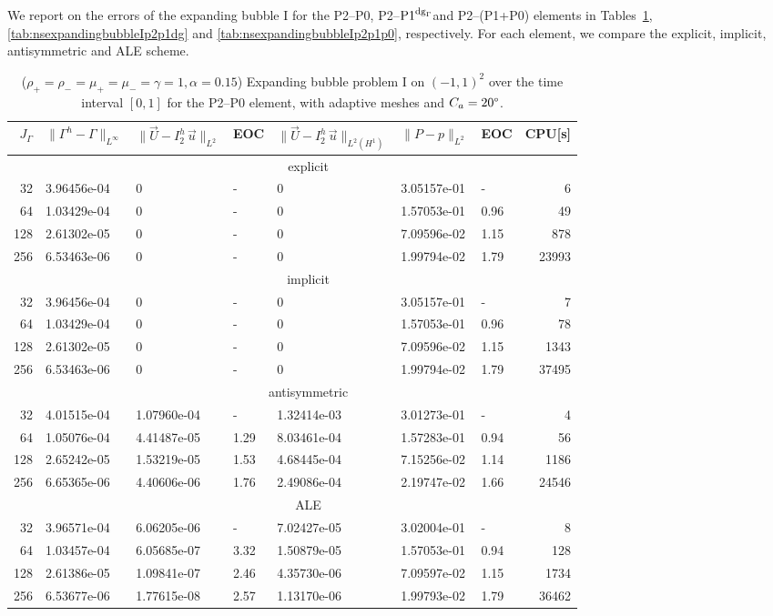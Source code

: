 \documentclass[a4paper,12pt,onecolumn]{article}
\newcommand{\errorXx}{\|\Gamma^h - \Gamma\|_{L^\infty}}
\newcommand{\LerrorUu}[1]{\|\vec U - I^h_{#1}\,\vec u\|_{L^2}}
\newcommand{\HerrorUu}[1]{\|\vec U - I^h_{#1}\,\vec u\|_{L^2(H^1)}}
\newcommand{\LerrorPp}{\|P - p\|_{L^2}}
\newcommand{\pdg}{${\rm P1}^{{\rm dg}_\Gamma}$} %
\begin{document}
We report on the errors of the expanding bubble I for the P2--P0, P2--\pdg and
P2--(P1+P0) elements in Tables~\ref{tab:nsexpandingbubbleIp2p0},
\ref{tab:nsexpandingbubbleIp2p1dg} and \ref{tab:nsexpandingbubbleIp2p1p0},
respectively. For each element, we compare the explicit, implicit,
antisymmetric and ALE scheme.
\begin{table}
\center
\hspace*{-3.25cm}
\begin{tabular}{rllllllr}
\hline
$J_\Gamma$ & $\errorXx$ & $\LerrorUu2$ & EOC & $\HerrorUu2$ & $\LerrorPp$ & EOC
& CPU[s] \\
\hline
& \multicolumn{7}{c}{explicit} \\
\hline
 32 & 3.96456e-04 & 0 & - & 0 & 3.05157e-01 &    - &     6 \\
 64 & 1.03429e-04 & 0 & - & 0 & 1.57053e-01 & 0.96 &    49 \\
128 & 2.61302e-05 & 0 & - & 0 & 7.09596e-02 & 1.15 &   878 \\
256 & 6.53463e-06 & 0 & - & 0 & 1.99794e-02 & 1.79 & 23993 \\
\hline
& \multicolumn{7}{c}{implicit} \\
\hline
 32 & 3.96456e-04 & 0 & - & 0 & 3.05157e-01 &    - &     7 \\
 64 & 1.03429e-04 & 0 & - & 0 & 1.57053e-01 & 0.96 &    78 \\
128 & 2.61302e-05 & 0 & - & 0 & 7.09596e-02 & 1.15 &  1343 \\
256 & 6.53463e-06 & 0 & - & 0 & 1.99794e-02 & 1.79 & 37495 \\
\hline
& \multicolumn{7}{c}{antisymmetric} \\
\hline
 32 & 4.01515e-04 & 1.07960e-04 &    - & 1.32414e-03 & 3.01273e-01 &    - &
4 \\
 64 & 1.05076e-04 & 4.41487e-05 & 1.29 & 8.03461e-04 & 1.57283e-01 & 0.94 &
56 \\
128 & 2.65242e-05 & 1.53219e-05 & 1.53 & 4.68445e-04 & 7.15256e-02 & 1.14 &
1186 \\
256 & 6.65365e-06 & 4.40606e-06 & 1.76 & 2.49086e-04 & 2.19747e-02 & 1.66 &
24546 \\
\hline
& \multicolumn{7}{c}{ALE} \\
\hline
 32 & 3.96571e-04 & 6.06205e-06 &    - & 7.02427e-05 & 3.02004e-01 &    - &
8 \\
 64 & 1.03457e-04 & 6.05685e-07 & 3.32 & 1.50879e-05 & 1.57053e-01 & 0.94 &
128 \\
128 & 2.61386e-05 & 1.09841e-07 & 2.46 & 4.35730e-06 & 7.09597e-02 & 1.15 &
1734 \\
256 & 6.53677e-06 & 1.77615e-08 & 2.57 & 1.13170e-06 & 1.99793e-02 & 1.79 &
36462 \\
\hline
\end{tabular}
\hspace*{-3.25cm}
\caption[Navier--Stokes expanding bubble I errors P2--P0]
{($\rho_+ = \rho_- = \mu_+ = \mu_- = \gamma = 1,\alpha=0.15$)
Expanding bubble problem I on $(-1,1)^2$ over the time interval $[0,1]$ for the
P2--P0 element, with adaptive meshes and $C_a=20\degree$.}
\label{tab:nsexpandingbubbleIp2p0}
\end{table}
\end{document}

